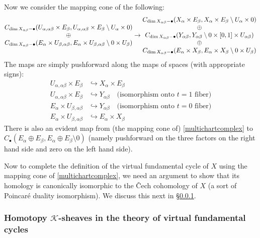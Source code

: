 \documentclass[12pt]{article}
\theoremstyle{definition}
\theoremstyle{remark}
\numberwithin{equation}{subsection}
\newcommand{\K}{\mathcal K}
\begin{document}
Now we consider the mapping cone of the following:
\begin{equation}\label{multichartcomplex}
\begin{matrix}
C_{\dim X_{\alpha\beta}-\bullet}(U_{\alpha,\alpha\beta}\times E_\beta,U_{\alpha,\alpha\beta}\times E_\beta\setminus U_\alpha\times 0)\cr\oplus\cr
C_{\dim X_{\alpha\beta}-\bullet}(E_\alpha\times U_{\beta,\alpha\beta},E_\alpha\times U_{\beta,\alpha\beta}\setminus 0\times U_\beta)
\end{matrix}
\to
\begin{matrix}
C_{\dim X_{\alpha\beta}-\bullet}(X_\alpha\times E_\beta,X_\alpha\times E_\beta\setminus U_\alpha\times 0)\cr\oplus\cr
C_{\dim X_{\alpha\beta}-\bullet}(Y_{\alpha\beta},Y_{\alpha\beta}\setminus 0\times[0,1]\times U_{\alpha\beta})\cr\oplus\cr
C_{\dim X_{\alpha\beta}-\bullet}(E_\alpha\times X_\beta,E_\alpha\times X_\beta\setminus 0\times U_\beta)
\end{matrix}
\end{equation}
The maps are simply pushforward along the maps of spaces (with appropriate signs):
\begin{align}
U_{\alpha,\alpha\beta}\times E_\beta&\hookrightarrow X_\alpha\times E_\beta\\
U_{\alpha,\alpha\beta}\times E_\beta&\hookrightarrow Y_{\alpha\beta}\quad\text{(isomorphism onto $t=1$ fiber)}\\
E_\alpha\times U_{\beta,\alpha\beta}&\hookrightarrow Y_{\alpha\beta}\quad\text{(isomorphism onto $t=0$ fiber)}\\
E_\alpha\times U_{\beta,\alpha\beta}&\hookrightarrow E_\alpha\times X_\beta
\end{align}
There is also an evident map from (the mapping cone of) \eqref{multichartcomplex} to $C_\bullet(E_\alpha\oplus E_\beta,E_\alpha\oplus E_\beta\setminus 0)$ (namely pushforward on the three factors on the right hand side and zero on the left hand side).

Now to complete the definition of the virtual fundamental cycle of $X$ using the mapping cone of \eqref{multichartcomplex}, we need an argument to show that its homology is canonically isomorphic to the \v Cech cohomology of $X$ (a sort of Poincar\'e duality isomorphism).  We discuss this next in \S\ref{homotopysheavesintrosec}.

\subsubsection{Homotopy \texorpdfstring{$\K$}{K}-sheaves in the theory of virtual fundamental cycles}\label{homotopysheavesintrosec}
\end{document}
